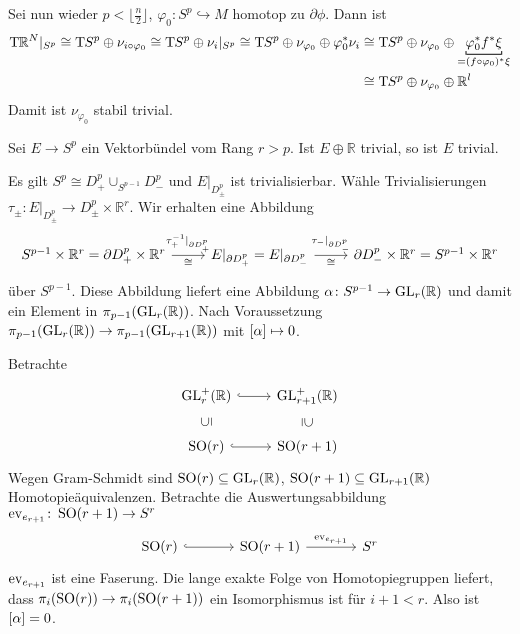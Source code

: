 Sei nun wieder $p < \lfloor \frac{n}{2}\rfloor$, $\varphi_0 \colon S^p \hookrightarrow M$ homotop zu $\partial \phi$.
Dann ist
\begin{align}
	\Tmap \mathbb{R}^N|_{S^p} \cong \Tmap S^p \oplus \nu_{i \circ \varphi_0} \cong \Tmap S^p \oplus \nu_i|_{S^p} \cong \Tmap S^p \oplus \nu_{\varphi_0} \oplus \varphi_0^* \nu_i &\cong \Tmap S^p \oplus \nu_{\varphi_0} \oplus \Underbracket{\varphi_0^* f^* \xi}{=(f \circ \varphi_0)^* \xi} \\
	&\cong \Tmap S^p \oplus \nu_{\varphi_0} \oplus \mathbb{R}^l
\end{align}
Damit ist $\nu_{\varphi_0}$ stabil trivial.

\begin{proposition}
	Sei $E \to S^p$ ein Vektorbündel vom Rang $r > p$.
	Ist $E \oplus \mathbb{R}$ trivial, so ist $E$ trivial.
\end{proposition}
\begin{beweis}
	Es gilt $S^p \cong D^p_+ \cup_{S^{p-1}}  D^p_-$ und $E|_{D^p_\pm}$ ist trivialisierbar.
	Wähle Trivialisierungen $\tau_\pm \colon E|_{D_\pm^p} \to D^p_\pm \times \mathbb{R}^r$.
	Wir erhalten eine Abbildung 
	\[
		\begin{tikzcd}
			S^{p-1} \times \mathbb{R}^r = \partial D^p_+ \times \mathbb{R}^r  \rar["\tau_+^{-1}|_{\partial D^p_+}","\cong"'] & E|_{\partial D^p_+} = E|_{\partial D^p_-} \rar["\tau_-|_{\partial D^p_-}","\cong"'] & \partial D^p_- \times \mathbb{R}^r = S^{p-1} \times \mathbb{R}^r
		\end{tikzcd}
	\]
	über $S^{p-1}$.
	Diese Abbildung liefert eine Abbildung $\alpha \colon S^{p-1} \to \GL_r(\mathbb{R})$ und damit ein Element in $\pi_{p-1} \enbrace*{\GL_r(\mathbb{R})}$.
	Nach Voraussetzung $\pi_{p-1} \enbrace*{\GL_r(\mathbb{R})} \to \pi_{p-1} \enbrace*{\GL_{r+1}(\mathbb{R})}$ mit $\benbrace*{\alpha} \mapsto 0$.
	
	Betrachte 
	\[
		\begin{tikzcd}
			\GL^+_r(\mathbb{R}) \rar[hook] & \GL^+_{r+1}(\mathbb{R}) \dar[sloped,phantom,"\supseteq"] \\
			\SO(r) \rar[hook] \uar[sloped,phantom,"\subseteq"] & \SO(r+1)
		\end{tikzcd}
	\]
	Wegen Gram-Schmidt sind $\SO(r) \subseteq \GL_r(\mathbb{R})$, $\SO(r+1) \subseteq \GL_{r+1}(\mathbb{R})$ Homotopieäquivalenzen.
	Betrachte die Auswertungsabbildung $\ev_{e_{r+1}} \colon \SO(r+1) \to S^r$
	\[
		\begin{tikzcd}[sep=large]
			\SO(r) \rar[hook] &   \SO(r+1) \rar["\ev_{e_{r+1}}"] & S^r
		\end{tikzcd}
	\]
	$\ev_{e_{r+1}}$ ist eine Faserung.
	Die lange exakte Folge von Homotopiegruppen liefert, dass $\pi_i(\SO(r)) \to \pi_i(\SO(r+1))$ ein Isomorphismus ist für $i+1 < r$.
	Also ist $\benbrace*{\alpha}=0$.
\end{beweis}

